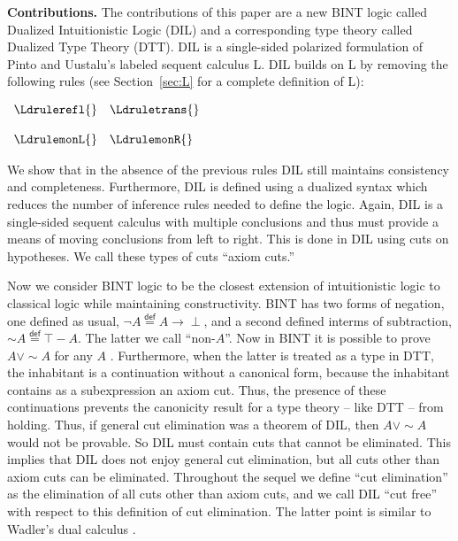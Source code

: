 \textbf{Contributions.} The contributions of this paper are a new BINT
logic called Dualized Intuitionistic Logic (DIL) and a corresponding
type theory called Dualized Type Theory (DTT).  DIL is a single-sided
polarized formulation of Pinto and Uustalu's labeled sequent calculus
L.  DIL builds on L by removing the following rules (see
Section~\ref{sec:L} for a complete definition of L):
\begin{center}
  \begin{math}
    \begin{array}{lll}
      \Ldrulerefl{} & \Ldruletrans{}\\
      & \\
      \LdrulemonL{} & \LdrulemonR{}   
    \end{array}
  \end{math}
\end{center} 
We show that in the absence of the previous rules DIL still maintains
consistency and completeness.  Furthermore, DIL is defined using a
dualized syntax which reduces the number of inference rules needed to
define the logic.  Again, DIL is a single-sided sequent calculus with
multiple conclusions and thus must provide a means of moving
conclusions from left to right. This is done in DIL using cuts on
hypotheses. We call these types of cuts ``axiom cuts.''  

Now we consider BINT logic to be the closest extension of
intuitionistic logic to classical logic while maintaining
constructivity.  BINT has two forms of negation, one defined as usual,
$\lnot A \stackrel{\mathsf{def}}{=} A \to \perp$, and a second defined
interms of subtraction, $\mathrel{\sim} A \stackrel{\mathsf{def}}{=}
\top - A$.  The latter we call ``non-$A$''.  Now in BINT it is
possible to prove $A \lor \mathrel{\sim} A$ for any $A$
\cite{crolard01}. Furthermore, when the latter is treated as a type in
DTT, the inhabitant is a continuation without a canonical form,
because the inhabitant contains as a subexpression an axiom cut.
Thus, the presence of these continuations prevents the canonicity
result for a type theory -- like DTT -- from holding.  Thus, if
general cut elimination was a theorem of DIL, then $A \lor
\mathrel{\sim} A$ would not be provable.  So DIL must contain cuts
that cannot be eliminated.  This implies that DIL does not enjoy
general cut elimination, but all cuts other than axiom cuts can be
eliminated. Throughout the sequel we define ``cut elimination'' as the
elimination of all cuts other than axiom cuts, and we call DIL ``cut
free'' with respect to this definition of cut elimination. The latter
point is similar to Wadler's dual calculus \cite{Wadler:2005}.

